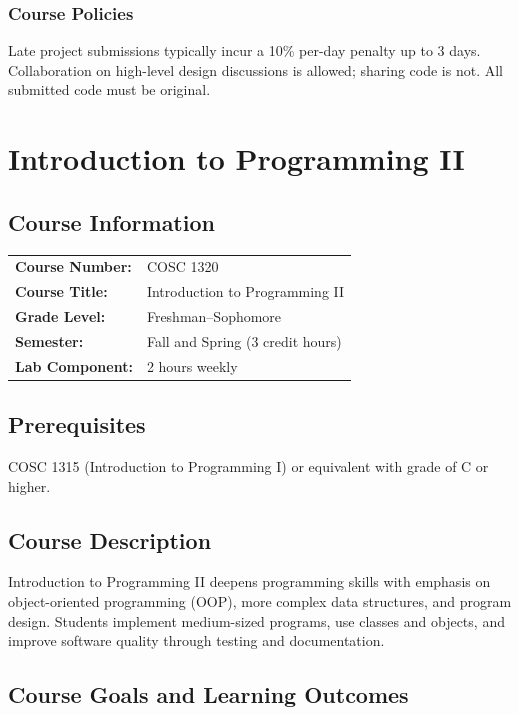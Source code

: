 \documentclass[12pt,oneside]{book}
\begin{document}
\subsection{Course Policies}

Late project submissions typically incur a 10\% per-day penalty up to 3 days. Collaboration on high-level design discussions is allowed; sharing code is not. All submitted code must be original.


\chapter{Introduction to Programming II}

\section{Course Information}

\begin{tabular}{ll}
\textbf{Course Number:} & COSC 1320 \\
\textbf{Course Title:} & Introduction to Programming II \\
\textbf{Grade Level:} & Freshman--Sophomore \\
\textbf{Semester:} & Fall and Spring (3 credit hours) \\
\textbf{Lab Component:} & 2 hours weekly \\
\end{tabular}

\section{Prerequisites}

COSC 1315 (Introduction to Programming I) or equivalent with grade of C or higher.

\section{Course Description}

Introduction to Programming II deepens programming skills with emphasis on object-oriented programming (OOP), more complex data structures, and program design. Students implement medium-sized programs, use classes and objects, and improve software quality through testing and documentation.

\section{Course Goals and Learning Outcomes}
\end{document}

